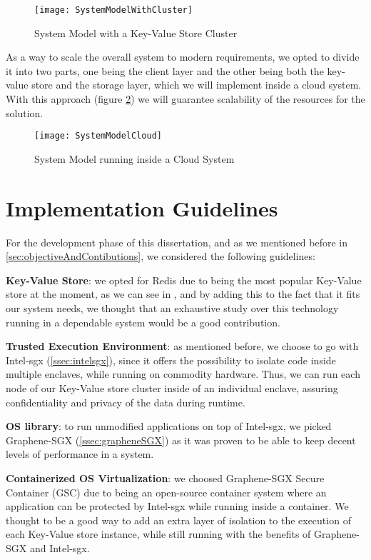 \begin{figure}[htbp]
	\centering
	{\texttt{[image: SystemModelWithCluster]}}
	\caption{System Model with a Key-Value Store Cluster}
	\label{fig:systemModelCluster}
\end{figure}

As a way to scale the overall system to modern requirements, we opted to divide it into two parts, one being the client layer and the other being both the key-value store and the storage layer, which we will implement inside a cloud system. With this approach (figure \ref{fig:systemModelCloud}) we will guarantee scalability of the resources for the solution.

\begin{figure}[htbp]
	\centering
	{\texttt{[image: SystemModelCloud]}}
	\caption{System Model running inside a Cloud System}
	\label{fig:systemModelCloud}
\end{figure}

\section{Implementation Guidelines} %

For the development phase of this dissertation, and as we mentioned before in \ref{sec:objectiveAndContibutions}, we considered the following guidelines:

\textbf{Key-Value Store}: we opted for Redis due to being the most popular Key-Value store at the moment, as we can see in \cite{rankingKVStores}, and by adding this to the fact that it fits our system needs, we thought that an exhaustive study over this technology running in a dependable system would be a good contribution.

\textbf{Trusted Execution Environment}: as mentioned before, we choose to go with Intel-\gls{sgx} (\ref{ssec:intelsgx}), since it offers the possibility to isolate code inside multiple enclaves, while running on commodity hardware. Thus, we can run each node of our Key-Value store cluster inside of an individual enclave, assuring confidentiality and privacy of the data during runtime.

\textbf{OS library}: to run unmodified applications on top of Intel-\gls{sgx}, we picked Graphene-SGX (\ref{ssec:grapheneSGX}) as it was proven to be able to keep decent levels of performance in a system.

\textbf{Containerized OS Virtualization}: we choosed Graphene-SGX Secure Container (GSC) due to being an open-source container system where an application can be protected by Intel-\gls{sgx} while running inside a container. We thought to be a good way to add an extra layer of isolation to the execution of each Key-Value store instance, while still running with the benefits of Graphene-SGX and Intel-\gls{sgx}.


